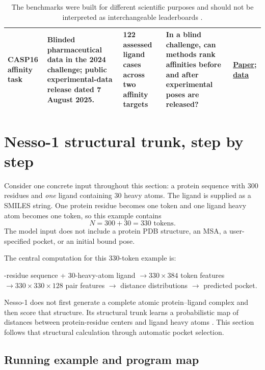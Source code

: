 \documentclass[11pt]{article}
\begin{document}
\begin{table}[H]
\begin{tabular}{L{0.13\textwidth}L{0.21\textwidth}L{0.13\textwidth}L{0.28\textwidth}L{0.15\textwidth}}
CASP16 affinity task & Blinded pharmaceutical data in the 2024 challenge; public experimental-data release dated 7 August 2025. & 122 assessed ligand cases across two affinity targets & In a blind challenge, can methods rank affinities before and after experimental poses are released? & \href{https://doi.org/10.1002/prot.70061}{Paper}; \href{https://doi.org/10.5281/zenodo.16762332}{data} \\
\bottomrule
\end{tabular}
\caption{The benchmarks were built for different scientific purposes and
should not be interpreted as interchangeable leaderboards
\citep{wang2015fepplus,hahn2022bindingbenchmarks,ross2023fepaccuracy,
openfe2024industry,gilson2026casp16,gaieb2019d3rgc3}.}
\label{tab:benchmark_landscape}
\end{table}

\section{Nesso-1 structural trunk, step by step}

Consider one concrete input throughout this section: a protein sequence with
300 residues and \emph{one} ligand containing 30 heavy atoms. The ligand is
supplied as a SMILES string. One protein residue becomes one token and one
ligand heavy atom becomes one token, so this example contains
\[
  N=300+30=330\text{ tokens}.
\]
The model input does not include a protein PDB structure, an MSA, a
user-specified pocket, or an initial bound pose.

The central computation for this 330-token example is:

\begin{center}
\colorbox{light}{\parbox{0.88\textwidth}{-residue sequence + 30-heavy-atom ligand
$\longrightarrow 330\times384$ token features
$\longrightarrow 330\times330\times128$ pair features
$\longrightarrow$ distance distributions
$\longrightarrow$ predicted pocket.}}
\end{center}

Nesso-1 does not first generate a complete atomic protein--ligand complex and
then score that structure. Its structural trunk learns a probabilistic map of
distances between protein-residue centers and ligand heavy atoms
\citep{shenoy2026nesso1}. This section follows that structural calculation
through automatic pocket selection.

\subsection{Running example and program map}
\end{document}
